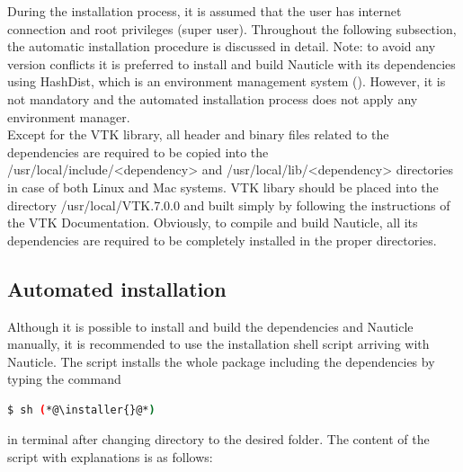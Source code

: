 \documentclass[a4paper,12pt,openany]{book}
\newcommand{\myhref}[3][nauticlegreen_dark]{\href{#2}{\color{#1}{#3}}}%
\theoremstyle{break}
\begin{document}
During the installation process, it is assumed that the user has internet connection and root privileges (super user). Throughout the following subsection, the automatic installation procedure is discussed in detail.
Note: to avoid any version conflicts it is preferred to install and build Nauticle with its dependencies using HashDist, which is an environment management system (\myhref{https://github.com/hashdist/hashdist}{https://github.com/hashdist/ hashdist}). However, it is not mandatory and the automated installation process does not apply any environment manager. \\
Except for the VTK library, all header and binary files related to the dependencies are required to be copied into the /usr/local/include/<dependency> and /usr/local/lib/<dependency> directories in case of both Linux and Mac systems. VTK libary should be placed into the directory /usr/local/VTK.7.0.0 and built simply by following the instructions of the VTK Documentation. Obviously, to compile and build Nauticle, all its dependencies are required to be completely installed in the proper directories. 
\subsection{Automated installation}
Although it is possible to install and build the dependencies and Nauticle manually, it is recommended to use the installation shell script arriving with Nauticle. The script installs the whole package including the dependencies by typing the command
\begin{lstlisting}[language=bash]
  $ sh (*@\installer{}@*)
\end{lstlisting}
in terminal after changing directory to the desired folder. The content of the script with explanations is as follows:
\end{document}
